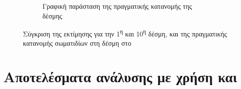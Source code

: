 \begin{figure}[tph]
\begin{subfigure}{0.8\textwidth}
		\centering
		\caption{Γραφική παράσταση της πραγματικής κατανομής της δέσμης}
		\label{fig:CST-EBS-actual-weight-function}
	\end{subfigure}
\caption{Σύγκριση της εκτίμησης για την 1\textsuperscript{η} και 10\textsuperscript{η} δέσμη, και της πραγματικής κατανομής σωματιδίων στη δέσμη στο }
\label{fig:CST-EBS-implementation}
\end{figure}




\section{Αποτελέσματα ανάλυσης με χρήση  και }




